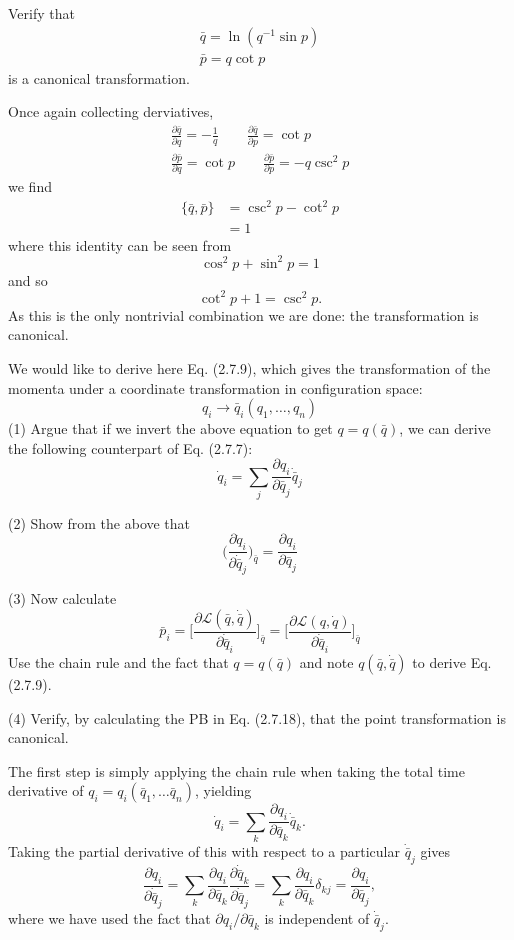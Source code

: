 \documentclass[../principles-of-quantum-mechanics.tex]{subfiles}
\begin{document}
\begin{questions}
		\question Verify that
		\begin{gather*}
			\bar{q} = \ln(q^{-1}\sin p) \\
			\bar{p} = q\cot p
		\end{gather*}
		is a canonical transformation.
		
		\begin{solution}
			Once again collecting derviatives,
			\begin{gather*}
				\frac{\partial \bar{q}}{\partial q} = -\frac{1}{q} \qquad \frac{\partial \bar{q}}{\partial p} = \cot p \\
				\frac{\partial \bar{p}}{\partial q} = \cot{p} \qquad \frac{\partial \bar{p}}{\partial p} = -q\csc^2p
			\end{gather*}
			we find
			\begin{align*}
				\{\bar{q}, \bar{p}\} &= \csc^2p - \cot^2 p \\
				&= 1
			\end{align*}
			where this identity can be seen from
			\[
				\cos^2p + \sin^2p = 1
			\]
			and so
			\[
				\cot^2p + 1 = \csc^2p.
			\]
			As this is the only nontrivial combination we are done: the transformation is canonical.
		\end{solution}
		
		\question We would like to derive here Eq. (2.7.9), which gives the transformation of the momenta under a coordinate transformation in configuration space:
		\[
			q_i \to \bar{q}_i(q_1, \dots, q_n)
		\]
		(1) Argue that if we invert the above equation to get $q = q(\bar{q})$, we can derive the following counterpart of Eq. (2.7.7):
		\[
			\dot{q}_i = \sum_j\frac{\partial q_i}{\partial \bar{q}_j}\dot{\bar{q}}_j
		\]
		
		(2) Show from the above that
		\[
			\Big(\frac{\partial\dot{q}_i}{\partial\dot{\bar{q}}_j}\Big)_{\bar{q}} = \frac{\partial q_i}{\partial\bar{q}_j}
		\]
		
		(3) Now calculate
		\[
			\bar{p}_i = \Big[\frac{\partial\mathcal{L}(\bar{q}, \dot{\bar{q}})}{\partial\dot{\bar{q}}_i}\Big]_{\bar{q}} = \Big[\frac{\partial\mathcal{L}({q}, \dot{{q}})}{\partial\dot{\bar{q}}_i}\Big]_{\bar{q}}
		\]
		Use the chain rule and the fact that $q = q(\bar{q})$ and note $q(\bar{q}, \dot{\bar{q}})$ to derive Eq. (2.7.9).
		
		(4) Verify, by calculating the PB in Eq. (2.7.18), that the point transformation is canonical.
		
		\begin{solution}
			The first step is simply applying the chain rule when taking the total time derivative of $q_i = q_i(\bar{q}_1,\dots\bar{q}_n)$, yielding
			\[
				\dot{q}_i = \sum_k\frac{\partial q_i}{\partial \bar{q}_k}\dot{\bar{q}}_k.
			\]
			Taking the partial derivative of this with respect to a particular $\dot{\bar{q}}_j$ gives
			\[
				\frac{\partial\dot{q}_i}{\partial \dot{\bar{q}}_j} = \sum_k\frac{\partial q_i}{\partial \bar{q}_k} \frac{\partial \dot{\bar{q}}_k}{\partial \dot{\bar{q}}_j} = \sum_k\frac{\partial q_i}{\partial \bar{q}_k}\delta_{kj} = \frac{\partial q_i}{\partial \bar{q}_j},
			\]
			where we have used the fact that $\partial q_i / \partial \bar{q}_k$ is independent of $\dot{\bar{q}}_j$.
			

\end{solution}
\end{questions}
\end{document}

